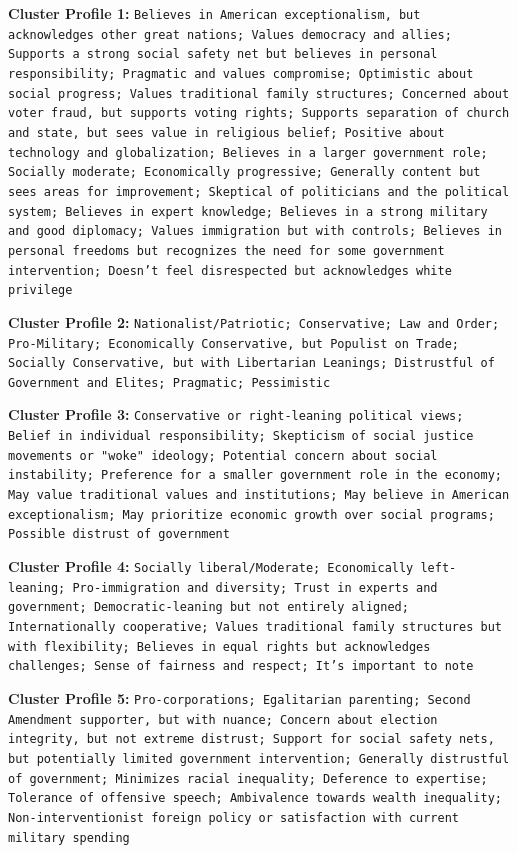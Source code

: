 \documentclass[11pt]{article}
\begin{document}
\textbf{Cluster Profile 1:} \texttt{Believes in American exceptionalism, but acknowledges other great nations; Values democracy and allies; Supports a strong social safety net but believes in personal responsibility; Pragmatic and values compromise; Optimistic about social progress; Values traditional family structures; Concerned about voter fraud, but supports voting rights; Supports separation of church and state, but sees value in religious belief; Positive about technology and globalization; Believes in a larger government role; Socially moderate; Economically progressive; Generally content but sees areas for improvement; Skeptical of politicians and the political system; Believes in expert knowledge; Believes in a strong military and good diplomacy; Values immigration but with controls; Believes in personal freedoms but recognizes the need for some government intervention; Doesn't feel disrespected but acknowledges white privilege}

\textbf{Cluster Profile 2:} \texttt{Nationalist/Patriotic; Conservative; Law and Order; Pro-Military; Economically Conservative, but Populist on Trade; Socially Conservative, but with Libertarian Leanings; Distrustful of Government and Elites; Pragmatic; Pessimistic}

\textbf{Cluster Profile 3:} \texttt{Conservative or right-leaning political views; Belief in individual responsibility; Skepticism of social justice movements or "woke" ideology; Potential concern about social instability; Preference for a smaller government role in the economy; May value traditional values and institutions; May believe in American exceptionalism; May prioritize economic growth over social programs; Possible distrust of government}

\textbf{Cluster Profile 4:} \texttt{Socially liberal/Moderate; Economically left-leaning; Pro-immigration and diversity; Trust in experts and government; Democratic-leaning but not entirely aligned; Internationally cooperative; Values traditional family structures but with flexibility; Believes in equal rights but acknowledges challenges; Sense of fairness and respect; It's important to note}

\textbf{Cluster Profile 5:} \texttt{Pro-corporations; Egalitarian parenting; Second Amendment supporter, but with nuance; Concern about election integrity, but not extreme distrust; Support for social safety nets, but potentially limited government intervention; Generally distrustful of government; Minimizes racial inequality; Deference to expertise; Tolerance of offensive speech; Ambivalence towards wealth inequality; Non-interventionist foreign policy or satisfaction with current military spending}
\end{document}
